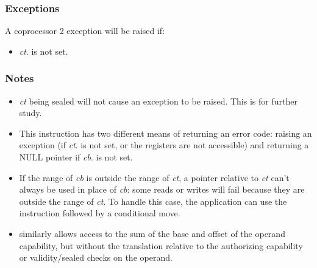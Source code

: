 
\subsubsection*{Exceptions}

A coprocessor 2 exception will be raised if:

\begin{itemize}
\item
\emph{ct}.\ctag{} is not set.
\end{itemize}

\subsubsection*{Notes}

\begin{itemize}
\item
\emph{ct} being sealed will not cause an exception to be raised.
This is for further study.
\item
This instruction has two different means of returning an error code:
raising an exception (if \emph{ct}.\ctag{} is not set, or the registers
are not accessible) and returning a NULL pointer if \emph{cb}.\ctag{}
is not set.
\item
If the range of \emph{cb} is outside the range of \emph{ct}, a pointer relative
to \emph{ct} can't always be used in place of \emph{cb}: some reads or writes
will fail because they are outside the range of \emph{ct}. To handle this case,
the application can use the  instruction
followed by a conditional move.

\item {} similarly allows access to the sum of the base
and offset of the operand capability, but without the translation relative to the
authorizing capability or validity/sealed checks on the operand.
\end{itemize}
